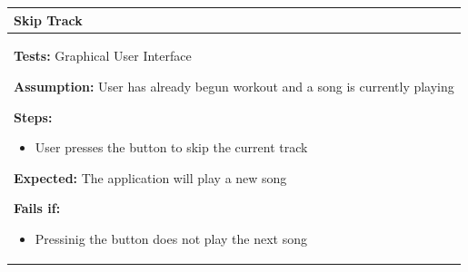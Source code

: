 \documentclass[letterpaper,english, 12pt]{scrreprt}
\begin{document}
\begin{center}
        \begin{tabular}{|C{15cm}|}
                \hline
                        \textbf{Skip Track}\\
                \hline
                        \begin{flushleft}
                                \textbf{Tests: } Graphical User Interface
                        \end{flushleft}
                        \begin{flushleft}
                                \textbf{Assumption: } User has already begun workout and a song is currently playing
                        \end{flushleft}
                        \begin{flushleft}
                                \textbf{Steps:}
                        \end{flushleft}
				\begin{itemize}
					\item User presses the button to skip the current track
				\end{itemize}
			\begin{flushleft}
				\textbf{Expected: } The application will play a new song
			\end{flushleft}
                        \begin{flushleft}
                                \textbf{Fails if: }
                        \end{flushleft}
                                \begin{itemize}
					\item Pressinig the button does not play the next  song
                                \end{itemize}
				\\
		\hline
        \end{tabular}
\end{center}
\end{document}
